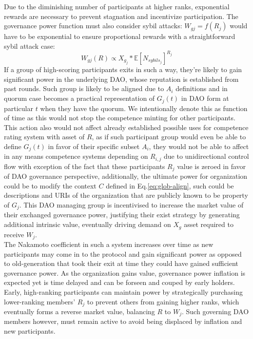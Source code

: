 \documentclass{article}
\begin{document}
\begin{CJK}{UTF8}{gbsn}
\begin{multicols}{2}
        Due to the diminishing number of participants at higher ranks, exponential rewards are necessary to prevent stagnation and incentivize participation. The governance power function must also consider sybil attacks: $W_{gj} = f(R_{j})$ would have to be exponential to ensure proportional rewards with a straightforward sybil attack case: $$W_{gj}(R) \propto  X_{g_j}*\mathbb{E}[N_{sybils_j}]^{R_j}$$
        If a group of high-scoring participants exits in such a way, they're likely to gain significant power in the underlying DAO, whose reputation is established from past rounds. Such group is likely to be aligned due to $A_{i}$ definitions and in quorum case becomes a practical representation of $G_j(t)$ in DAO form at particular $t$ when they have the quorum. We intentionally denote this as function of time as this would not stop the competence minting for other participants. This action also would not affect already established possible uses for competence rating system with asset of $R$, as if such participant group would even be able to define $G_j(t)$ in favor of their specific subset $A_{i}$, they would not be able to affect in any means competence systems depending on $R_{i,j}$ due to unidirectional control flow with exception of the fact that these participants $R_{j}$ value is zeroed in favor of DAO governance perspective, additionally, the ultimate power for organization could be to modify the context $C$ defined in Eq.\ref{eq:glob-align}, such could be descriptions and URIs of the organization that are publicly known to be property of $G_j$.
        This DAO managing group is incentivised to increase the market value of their exchanged governance power, justifying their exist strategy by generating additional intrinsic value, eventually driving demand on $X_g$ asset required to receive $W_j$. \\
        The Nakamoto coefficient in such a system increases over time as new participants may come in to the protocol and gain significant power as opposed to old-generation that took their exit at time they could have gained sufficient governance power. As the organization gains value, governance power inflation is expected yet is time delayed and can be forseen and couped by early holders. Early, high-ranking participants can maintain power by strategically purchasing lower-ranking members' $R_{j}$ to prevent others from gaining higher ranks, which eventually forms a reverse market value, balancing $R$ to $W_j$. Such governing DAO members however, must remain active to avoid being displaced by inflation and new participants.





\end{multicols}
\end{CJK}
\end{document}
